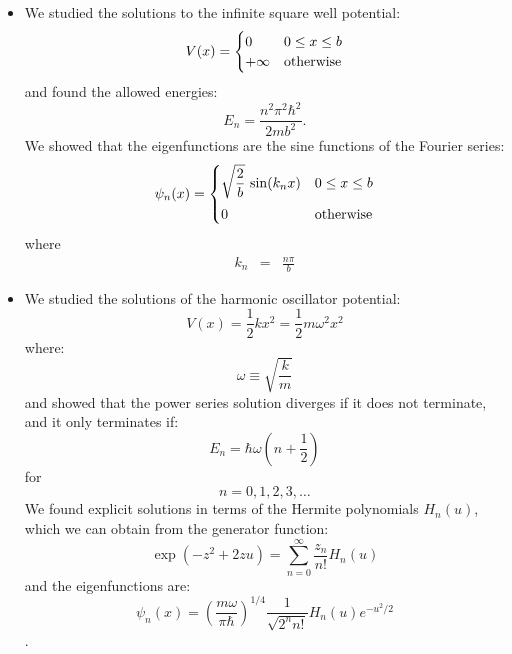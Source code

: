 \documentclass[12pt]{article}
\begin{document}
\begin{itemize}
\item We studied the solutions to the infinite square well potential:
\begin{equation}
V(x) = 
\begin{cases}    
   0 & 0 \leq x \leq b \\
   +\infty & {\rm otherwise} \\
\end{cases}   
\end{equation}
and found the allowed energies:
\begin{equation}
E_n = \frac{n^2 \pi^2 \hbar^2}{2mb^2}.
\end{equation}
We showed that the eigenfunctions are the sine functions of the Fourier series:
\begin{equation}
\psi_n(x) = 
\begin{cases}
{\displaystyle \sqrt{\frac{2}{b}} \, \sin(k_n x)} & 0 \leq x \leq b\\[8pt]
0 & \rm otherwise \\
\end{cases}
\end{equation}
where
\begin{eqnarray*}
k_n&=&\frac{n\pi}{b}
\end{eqnarray*}

\item We studied the solutions of the harmonic oscillator potential:
$$V(x) = \frac{1}{2}k x^2 = \frac{1}{2} m \omega^2 x^2$$
where:
$$\omega \equiv \sqrt{\frac{k}{m}}$$
and showed that the power series solution diverges if it does not terminate, and it only terminates if:
\begin{equation}
E_n = \hbar \omega \left( n + \frac{1}{2} \right)
\end{equation}
for
$$n=0,1,2,3,\ldots$$
We found explicit solutions in terms of the Hermite polynomials $H_n(u)$, which we can obtain from the generator function:
$$\exp(-z^2+2zu) = \sum_{n=0}^{\infty} \frac{z_n}{n!}H_n(u)$$
and the eigenfunctions are:
$$\psi_n(x) = \left( \frac{m \omega}{\pi \hbar} \right)^{1/4} \frac{1}{\sqrt{2^n n!}}H_n(u) e^{-u^2/2}$$.



\end{itemize}
\end{document}
